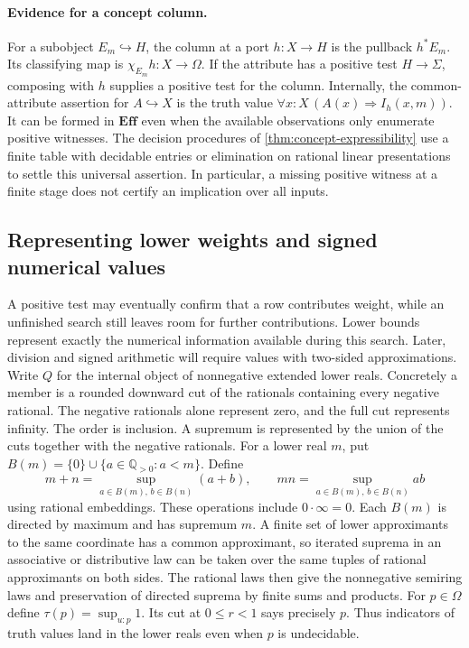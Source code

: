 \documentclass[11pt,a4paper]{article}
\theoremstyle{definition}
\theoremstyle{remark}\newaliascnt{remark}{theorem}
\newcommand{\E}{\mathbf{Eff}}
\newcommand{\Q}{\mathbb Q}
\numberwithin{equation}{section}
\begin{document}
\paragraph{Evidence for a concept column.}
For a subobject $E_m\hookrightarrow H$, the column at a port $h:X\to H$ is the pullback $h^*E_m$. Its classifying map is $\chi_{E_m}h:X\to\Omega$. If the attribute has a positive test $H\to\Sigma$, composing with $h$ supplies a positive test for the column. Internally, the common-attribute assertion for $A\hookrightarrow X$ is the truth value $\forall x:X\, (A(x)\Rightarrow I_h(x,m))$. It can be formed in $\E$ even when the available observations only enumerate positive witnesses. The decision procedures of \cref{thm:concept-expressibility} use a finite table with decidable entries or elimination on rational linear presentations to settle this universal assertion. In particular, a missing positive witness at a finite stage does not certify an implication over all inputs.

\subsection{Representing lower weights and signed numerical values}
A positive test may eventually confirm that a row contributes weight, while an unfinished search still leaves room for further contributions. Lower bounds represent exactly the numerical information available during this search. Later, division and signed arithmetic will require values with two-sided approximations.
Write \(Q\) for the internal object of nonnegative extended lower reals. Concretely a member is a rounded downward cut of the rationals containing every negative rational. The negative rationals alone represent zero, and the full cut represents infinity. The order is inclusion. A supremum is represented by the union of the cuts together with the negative rationals. For a lower real \(m\), put \(B(m)=\{0\}\cup\{a\in\Q_{>0}:a<m\}\). Define
\[
 m+n=\sup_{a\in B(m),\,b\in B(n)}(a+b),\qquad
 mn=\sup_{a\in B(m),\,b\in B(n)} ab
\]
using rational embeddings. These operations include \(0\cdot\infty=0\). Each \(B(m)\) is directed by maximum and has supremum \(m\). A finite set of lower approximants to the same coordinate has a common approximant, so iterated suprema in an associative or distributive law can be taken over the same tuples of rational approximants on both sides. The rational laws then give the nonnegative semiring laws and preservation of directed suprema by finite sums and products. For \(p\in\Omega\) define \(\tau(p)=\sup_{u:p}1\). Its cut at \(0\le r<1\) says precisely \(p\). Thus indicators of truth values land in the lower reals even when \(p\) is undecidable.
\end{document}
